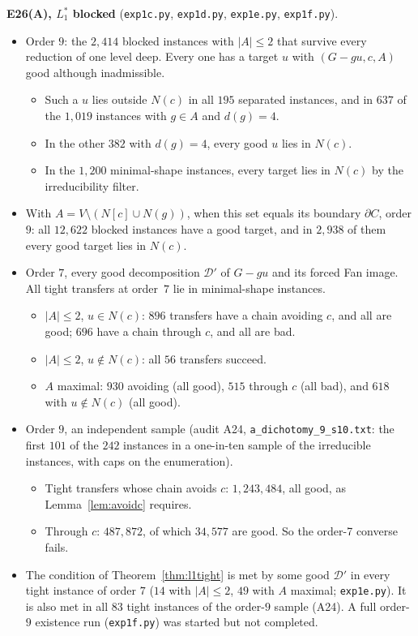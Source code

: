 \documentclass[11pt]{amsart}
\theoremstyle{definition}
\newcommand{\cD}{\mathcal D}
\begin{document}
\textbf{E26(A), $L_1^*$ blocked} (\texttt{exp1c.py}, \texttt{exp1d.py}, \texttt{exp1e.py}, \texttt{exp1f.py}).
\begin{itemize}
\item Order $9$: the $2{,}414$ blocked instances with $|A|\le2$ that survive every reduction of
\cite{L1S} one level deep. Every one has a target $u$ with $(G-gu,c,A)$ good although inadmissible.
  \begin{itemize}
  \item Such a $u$ lies outside $N(c)$ in all $195$ separated instances, and in $637$ of the
  $1{,}019$ instances with $g\in A$ and $d(g)=4$.
  \item In the other $382$ with $d(g)=4$, every good $u$ lies in $N(c)$.
  \item In the $1{,}200$ minimal-shape instances, every target lies in $N(c)$ by the irreducibility
  filter.
  \end{itemize}
\item With $A=V\setminus(N[c]\cup N(g))$, when this set equals its boundary $\partial C$, order
$9$: all $12{,}622$ blocked instances have a good target, and in $2{,}938$ of them every good target
lies in $N(c)$.
\item Order $7$, every good decomposition $\cD'$ of $G-gu$ and its forced Fan image. All tight
transfers at order~$7$ lie in minimal-shape instances.
  \begin{itemize}
  \item $|A|\le2$, $u\in N(c)$: $896$ transfers have a chain avoiding $c$, and all are good; $696$
  have a chain through $c$, and all are bad.
  \item $|A|\le2$, $u\notin N(c)$: all $56$ transfers succeed.
  \item $A$ maximal: $930$ avoiding (all good), $515$ through $c$ (all bad), and $618$ with
  $u\notin N(c)$ (all good).
  \end{itemize}
\item Order $9$, an independent sample (audit A24, \texttt{a\_dichotomy\_9\_s10.txt}: the first $101$
of the $242$ instances in a one-in-ten sample of the irreducible instances, with caps on the
enumeration).
  \begin{itemize}
  \item Tight transfers whose chain avoids $c$: $1{,}243{,}484$, all good, as
  Lemma~\ref{lem:avoidc} requires.
  \item Through $c$: $487{,}872$, of which $34{,}577$ are good. So the order-7 converse fails.
  \end{itemize}
\item The condition of Theorem~\ref{thm:l1tight} is met by some good $\cD'$ in every tight instance
of order $7$ ($14$ with $|A|\le2$, $49$ with $A$ maximal; \texttt{exp1e.py}). It is also met in all
$83$ tight instances of the order-$9$ sample (A24). A full order-$9$ existence run
(\texttt{exp1f.py}) was started but not completed.
\end{itemize}
\end{document}
